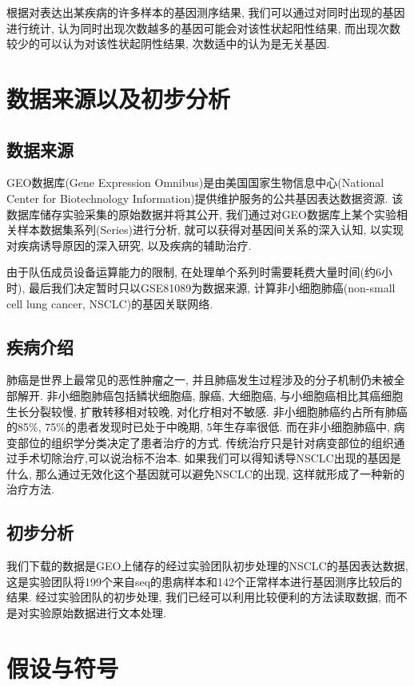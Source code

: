 \documentclass[zihao=-4]{ctexart}
\begin{document}
根据对表达出某疾病的许多样本的基因测序结果, 我们可以通过对同时出现的基因进行统计, 认为同时出现次数越多的基因可能会对该性状起阳性结果, 而出现次数较少的可以认为对该性状起阴性结果, 次数适中的认为是无关基因.


\section{数据来源以及初步分析}
\subsection{数据来源}
GEO数据库(Gene Expression Omnibus)是由美国国家生物信息中心(National Center for Biotechnology Information)提供维护服务的公共基因表达数据资源. 该数据库储存实验采集的原始数据并将其公开, 我们通过对GEO数据库上某个实验相关样本数据集系列(Series)进行分析, 就可以获得对基因间关系的深入认知, 以实现对疾病诱导原因的深入研究, 以及疾病的辅助治疗.

由于队伍成员设备运算能力的限制, 在处理单个系列时需要耗费大量时间(约6小时), 最后我们决定暂时只以GSE81089为数据来源, 计算非小细胞肺癌(non-small cell lung cancer, NSCLC)的基因关联网络.
\subsection{疾病介绍}
肺癌是世界上最常见的恶性肿瘤之一, 并且肺癌发生过程涉及的分子机制仍未被全部解开. 非小细胞肺癌\cite{wiki:NSCLC}包括鳞状细胞癌, 腺癌, 大细胞癌, 与小细胞癌相比其癌细胞生长分裂较慢, 扩散转移相对较晚, 对化疗相对不敏感. 非小细胞肺癌约占所有肺癌的85\%, 75\%的患者发现时已处于中晚期, 5年生存率很低. 而在非小细胞肺癌中, 病变部位的组织学分类决定了患者治疗的方式. 传统治疗只是针对病变部位的组织通过手术切除治疗,可以说治标不治本. 如果我们可以得知诱导NSCLC出现的基因是什么, 那么通过无效化这个基因就可以避免NSCLC的出现, 这样就形成了一种新的治疗方法.
\subsection{初步分析}
我们下载的数据是GEO上储存的经过实验团队初步处理的NSCLC的基因表达数据, 这是实验团队将199个来自seq的患病样本和142个正常样本进行基因测序比较后的结果. 经过实验团队的初步处理, 我们已经可以利用比较便利的方法读取数据, 而不是对实验原始数据进行文本处理. 

\section{假设与符号}
\end{document}
